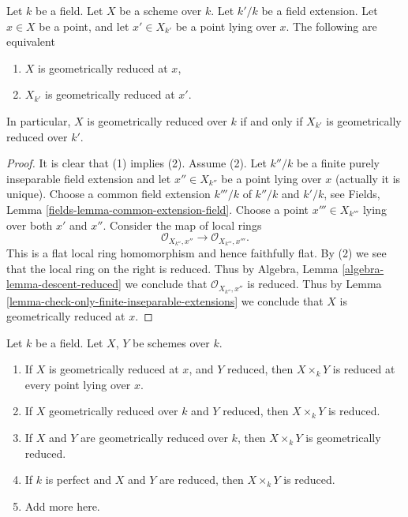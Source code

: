 \begin{lemma}
\label{lemma-geometrically-reduced-upstairs}
Let $k$ be a field.
Let $X$ be a scheme over $k$.
Let $k'/k$ be a field extension.
Let $x \in X$ be a point, and let $x' \in X_{k'}$ be a point lying over $x$.
The following are equivalent
\begin{enumerate}
\item $X$ is geometrically reduced at $x$,
\item $X_{k'}$ is geometrically reduced at $x'$.
\end{enumerate}
In particular, $X$ is geometrically reduced over $k$ if and only if
$X_{k'}$ is geometrically reduced over $k'$.
\end{lemma}

\begin{proof}
It is clear that (1) implies (2). Assume (2).
Let $k''/k$ be a finite purely inseparable field extension
and let $x'' \in X_{k''}$ be a point lying over $x$ (actually it is
unique). Choose a common field extension $k'''/k$ of $k''/k$ and $k'/k$, see
Fields, Lemma \ref{fields-lemma-common-extension-field}.
Choose a point $x''' \in X_{k'''}$ lying over both $x'$ and $x''$.
Consider the map of local rings
$$
\mathcal{O}_{X_{k''}, x''} \longrightarrow \mathcal{O}_{X_{k'''}, x'''}.
$$
This is a flat local ring homomorphism and hence faithfully flat.
By (2) we see that the local ring on the right is reduced.
Thus by Algebra, Lemma \ref{algebra-lemma-descent-reduced}
we conclude that $\mathcal{O}_{X_{k''}, x''}$ is reduced.
Thus by Lemma \ref{lemma-check-only-finite-inseparable-extensions}
we conclude that $X$ is geometrically reduced at $x$.
\end{proof}

\begin{lemma}
\label{lemma-geometrically-reduced-any-base-change}
Let $k$ be a field. Let $X$, $Y$ be schemes over $k$.
\begin{enumerate}
\item If $X$ is geometrically reduced at $x$, and $Y$ reduced,
then $X \times_k Y$ is reduced at every point lying over $x$.
\item If $X$ geometrically reduced over $k$ and $Y$ reduced, then
$X \times_k Y$ is reduced.
\item If $X$ and $Y$ are geometrically reduced over $k$, then
$X \times_k Y$ is geometrically reduced.
\item If $k$ is perfect and $X$ and $Y$ are reduced, then
$X \times_k Y$ is reduced.
\item Add more here.
\end{enumerate}
\end{lemma}

